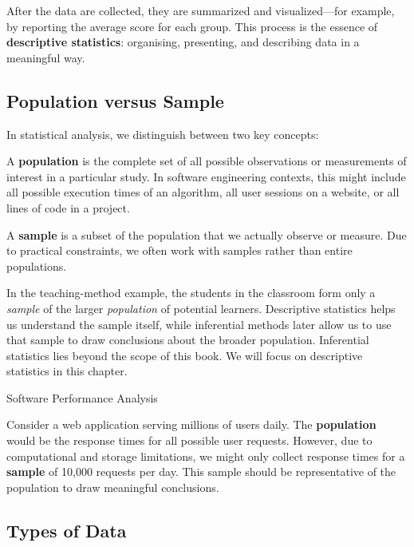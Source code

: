 After the data are collected, they are summarized and visualized—for example, by reporting the average score for each group. This process is the essence of \textbf{descriptive statistics}: organising, presenting, and describing data in a meaningful way.  

\subsection*{Population versus Sample}

In statistical analysis, we distinguish between two key concepts:

\begin{definition}[Population]
A \textbf{population} is the complete set of all possible observations or measurements of interest in a particular study. In software engineering contexts, this might include all possible execution times of an algorithm, all user sessions on a website, or all lines of code in a project.
\end{definition}

\begin{definition}[Sample]
A \textbf{sample} is a subset of the population that we actually observe or measure. Due to practical constraints, we often work with samples rather than entire populations.
\end{definition}

In the teaching-method example, the students in the classroom form only a \emph{sample} of the larger \emph{population} of potential learners. Descriptive statistics helps us understand the sample itself, while inferential methods later allow us to use that sample to draw conclusions about the broader population. Inferential statistics lies beyond the scope of this book. We will focus on descriptive statistics in this chapter.


\begin{example} Software Performance Analysis

Consider a web application serving millions of users daily. The \textbf{population} would be the response times for all possible user requests. However, due to computational and storage limitations, we might only collect response times for a \textbf{sample} of 10,000 requests per day. This sample should be representative of the population to draw meaningful conclusions.
\end{example}

\subsection*{Types of Data}

